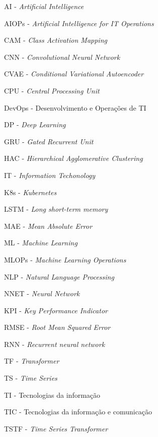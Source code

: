 \documentclass[
	12pt,				%
	openright,			%
	oneside,			%
	a4paper,			%
	english,			%
	french,				%
	spanish,			%
	brazil				%
	]{abntex2}
\begin{document}
\begin{siglas}
\item [AI] - \textit{Artificial Intelligence}
\item[AIOPs] - \textit{Artificial Intelligence for IT Operations}
\item[CAM] - \textit{Class Activation Mapping }
\item [CNN] - \textit{Convolutional Neural Network}
\item[CVAE] - \textit{Conditional Variational Autoencoder}
\item[CPU] - \textit{Central Processing Unit}
\item[DevOps] - Desenvolvimento e Operações de TI
\item[DP] - \textit{Deep Learning}
\item[GRU] - \textit{Gated Recurrent Unit}
\item[HAC] - \textit{Hierarchical Agglomerative Clustering}
\item[IT] - \textit{Information Techonology}
\item[K8s] - \textit{Kubernetes}
\item[LSTM] - \textit{Long short-term memory}
\item [MAE] - \textit{Mean Absolute Error}
\item[ML] - \textit{Machine Learning}
\item[MLOPs] - \textit{Machine Learning Operations}
\item [NLP] - \textit{Natural Language Processing}
\item[NNET] - \textit{Neural Network}
\item[KPI] - \textit{Key Performance Indicator}
\item[RMSE] - \textit{Root Mean Squared Error}
\item[RNN] - \textit{Recurrent neural network}
\item[TF] - \textit{Transformer}
\item[TS] - \textit{Time Series}
\item [TI] - Tecnologias da informação
\item [TIC] - Tecnologias da informação e comunicação
\item[TSTF] - \textit{Time Series Transformer}


\end{siglas}


\tableofcontents
\cleardoublepage
\end{document}
